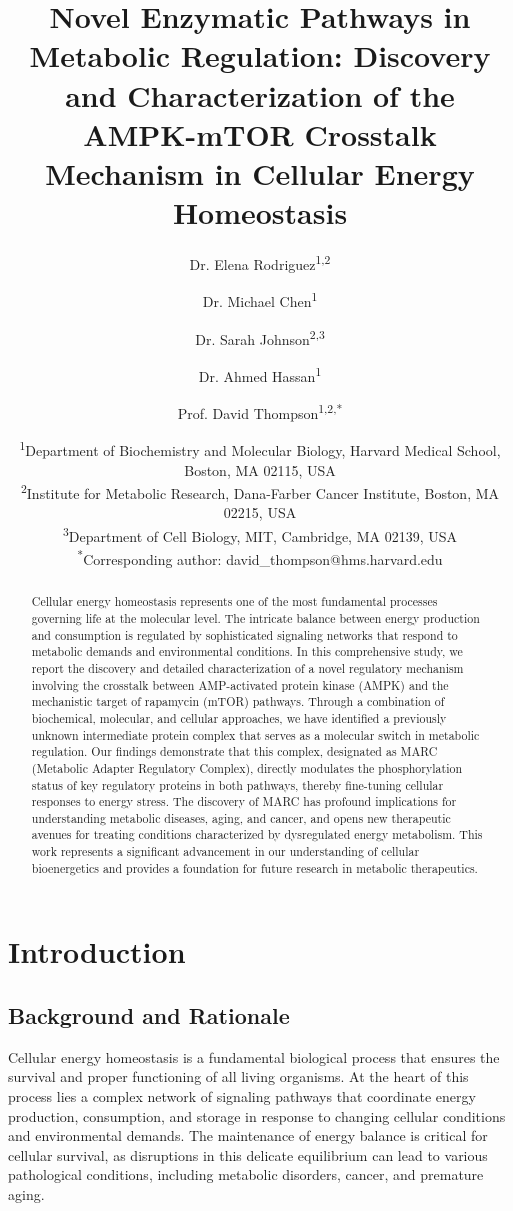 \documentclass[11pt,a4paper]{article}
\title{Novel Enzymatic Pathways in Metabolic Regulation: Discovery and Characterization of the AMPK-mTOR Crosstalk Mechanism in Cellular Energy Homeostasis}
\author{Dr. Elena Rodriguez\textsuperscript{1,2} \and 
        Dr. Michael Chen\textsuperscript{1} \and 
        Dr. Sarah Johnson\textsuperscript{2,3} \and 
        Dr. Ahmed Hassan\textsuperscript{1} \and 
        Prof. David Thompson\textsuperscript{1,2,*}}
\date{\textsuperscript{1}Department of Biochemistry and Molecular Biology, Harvard Medical School, Boston, MA 02115, USA\\
\textsuperscript{2}Institute for Metabolic Research, Dana-Farber Cancer Institute, Boston, MA 02215, USA\\
\textsuperscript{3}Department of Cell Biology, MIT, Cambridge, MA 02139, USA\\
\textsuperscript{*}Corresponding author: david\_thompson@hms.harvard.edu}
\begin{document}
\maketitle

\begin{abstract}
Cellular energy homeostasis represents one of the most fundamental processes governing life at the molecular level. The intricate balance between energy production and consumption is regulated by sophisticated signaling networks that respond to metabolic demands and environmental conditions. In this comprehensive study, we report the discovery and detailed characterization of a novel regulatory mechanism involving the crosstalk between AMP-activated protein kinase (AMPK) and the mechanistic target of rapamycin (mTOR) pathways. Through a combination of biochemical, molecular, and cellular approaches, we have identified a previously unknown intermediate protein complex that serves as a molecular switch in metabolic regulation. Our findings demonstrate that this complex, designated as MARC (Metabolic Adapter Regulatory Complex), directly modulates the phosphorylation status of key regulatory proteins in both pathways, thereby fine-tuning cellular responses to energy stress. The discovery of MARC has profound implications for understanding metabolic diseases, aging, and cancer, and opens new therapeutic avenues for treating conditions characterized by dysregulated energy metabolism. This work represents a significant advancement in our understanding of cellular bioenergetics and provides a foundation for future research in metabolic therapeutics.
\end{abstract}

\newpage

\tableofcontents

\newpage

\section{Introduction}

\subsection{Background and Rationale}

Cellular energy homeostasis is a fundamental biological process that ensures the survival and proper functioning of all living organisms. At the heart of this process lies a complex network of signaling pathways that coordinate energy production, consumption, and storage in response to changing cellular conditions and environmental demands. The maintenance of energy balance is critical for cellular survival, as disruptions in this delicate equilibrium can lead to various pathological conditions, including metabolic disorders, cancer, and premature aging.
\end{document}
